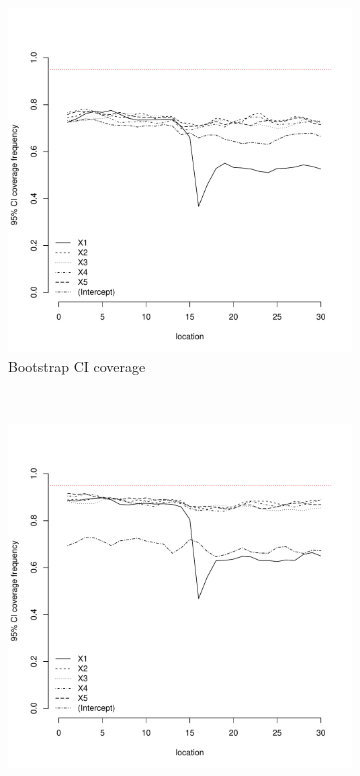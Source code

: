 \documentclass[authoryear, review, 11pt]{elsarticle}
\begin{document}
\begin{figure}
	\vspace{-30mm}
	\centering
	\begin{subfigure}[b]{0.45\textwidth}
	\centering
		\includegraphics[width=\textwidth]{../../figures/simulation/15.21.profile_bootstrap_coverage.pdf}
		\caption{Bootstrap CI coverage}
	\end{subfigure}%
	~ %
	\begin{subfigure}[b]{0.45\textwidth}
	\centering
		\includegraphics[width=\textwidth]{../../figures/simulation/15.21.profile_se_coverage.pdf}

\end{subfigure}
\end{figure}
\end{document}
